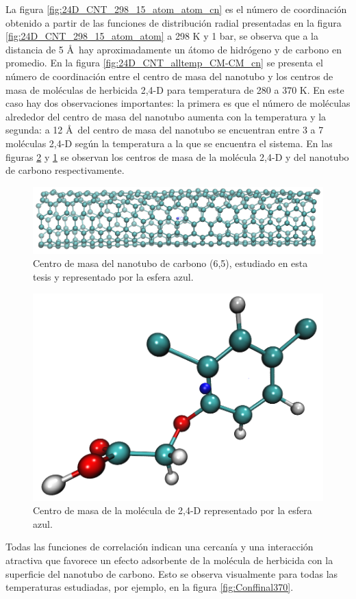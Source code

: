 \newpage

La figura \ref{fig:24D_CNT_298_15_atom_atom_cn} es el número de coordinación obtenido a partir de las funciones de distribución radial presentadas en la figura \ref{fig:24D_CNT_298_15_atom_atom} a 298 K  y 1 bar, se observa que a la distancia de 5 \AA\ hay aproximadamente un átomo de hidrógeno y de carbono en promedio. En la figura \ref{fig:24D_CNT_alltemp_CM-CM_cn} se presenta el número de coordinación entre el centro de masa del nanotubo y los centros de masa de moléculas de herbicida 2,4-D para temperatura de 280 a 370 K. En este caso hay dos observaciones importantes: la primera es que el número de moléculas alrededor del centro de masa del nanotubo aumenta con la temperatura y la segunda: a 12 \AA\  del centro de masa del nanotubo se encuentran entre 3 a 7 moléculas 2,4-D según la temperatura a la que se encuentra el sistema. En las figuras \ref{fig:24DCOM} y \ref{fig:CNTCOM} se observan los centros de masa de la molécula 2,4-D y del nanotubo de carbono respectivamente.\\

\begin{figure}[!h]
    \centering
    \includegraphics[width=.9\textwidth,keepaspectratio=true]{resultados/CNTCOM.png}
    \caption{Centro de masa del nanotubo de carbono (6,5), estudiado en esta tesis y representado por la esfera azul.}
    \label{fig:CNTCOM}
\end{figure}

\begin{figure}[!h]
    \centering
    \includegraphics[width=.3\textwidth,keepaspectratio=true]{resultados/24DCOM.png}
    \caption{Centro de masa de la molécula de 2,4-D representado por la esfera azul.}
    \label{fig:24DCOM}
\end{figure}

\newpage

Todas las funciones de correlación indican una cercanía y una interacción atractiva que favorece un efecto adsorbente de la molécula de herbicida con la superficie del nanotubo de carbono. Esto se observa visualmente para todas las temperaturas estudiadas, por ejemplo, en la figura \ref{fig:Conffinal370}. 

